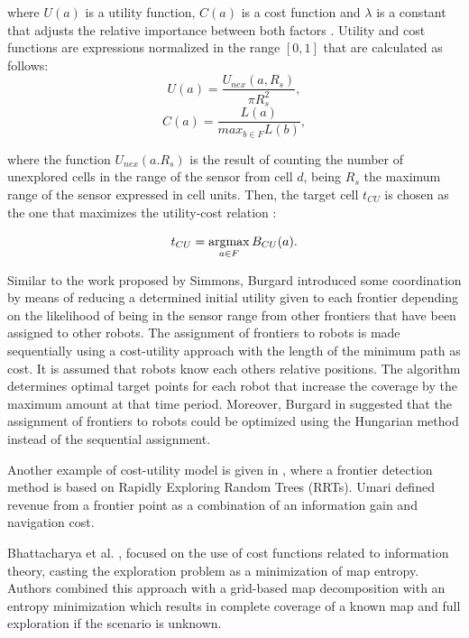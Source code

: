 where $U(a)$ is a utility function, $C(a)$ is a cost function and $\lambda$ is a constant that adjusts the relative importance between both factors \cite{Julia2012}. Utility and cost functions are expressions normalized in the range $\left[0, 1\right]$ that are calculated as follows:
\begin{equation}
U(a) = \frac{U_{nex}(a, R_{s})}{\pi R_{s}^{2}},
\end{equation}
\begin{equation}
C(a) = \frac{L(a)}{max_{b \in F}L(b)},
\end{equation}

where the function $U_{nex}(a. R_{s})$ is the result of counting the number of unexplored cells in the range of the sensor from cell $d$, being $R_{s}$ the maximum range of the sensor expressed in cell units.
Then, the target cell $t_{CU}$ is chosen as the one that maximizes the utility-cost relation \cite{Julia2012}:

\begin{equation}
t_{CU} = \operatorname*{argmax}_{a \in F} B_{CU}(a).
\end{equation}

Similar to the work proposed by Simmons, Burgard \cite{Burgard2000} introduced some coordination by means of reducing a determined initial utility given to each frontier depending on the likelihood of being in the sensor range from other frontiers that have been assigned to other robots. The assignment of frontiers to robots is made sequentially using a cost-utility approach with the length of the minimum path as cost. It is assumed that robots know each others relative positions. The algorithm determines optimal target points for each robot that increase the coverage by the maximum amount at that time period. Moreover, Burgard in \cite{Burgard2005} suggested that the assignment of frontiers to robots could be optimized using the Hungarian method \cite{Kuhn1955} instead of the sequential assignment.

Another example of cost-utility model is given in \cite{Umari2017}, where a frontier detection method is based on Rapidly Exploring Random Trees (RRTs). Umari defined revenue from a frontier point as a combination of an information gain and navigation cost.
 
Bhattacharya et al. \cite{Bhattacharya2013}, \cite{BhattacharyaGhrist2013} focused on the use of cost functions related to information theory, casting the exploration problem as a minimization of map entropy. Authors combined this approach with a grid-based map decomposition with an entropy minimization which results in complete coverage of a known map and full exploration if the scenario is unknown. 

